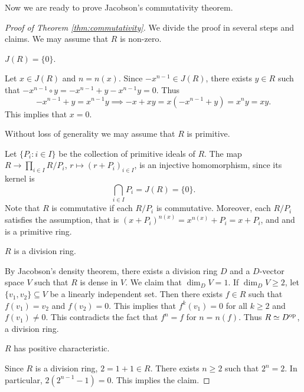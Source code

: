Now we are ready to prove Jacobson's commutativity theorem. 

\begin{proof}[Proof of Theorem \ref{thm:commutativity}]
    We divide the proof in several steps and claims. We may assume that 
    $R$ is non-zero. 
    
    \begin{claim}
        $J(R)=\{0\}$. 
    \end{claim}
    
    Let $x\in J(R)$ and $n=n(x)$. Since $-x^{n-1}\in J(R)$, 
    there exists $y\in R$ such that $-x^{n-1}\circ y=-x^{n-1}+y-x^{n-1}y=0$. Thus
    \[
    -x^{n-1}+y=x^{n-1}y\implies
    -x+xy=x(-x^{n-1}+y)=x^ny=xy.
    \]
    This implies that $x=0$.
    
    \begin{claim}
        Without loss of generality we may assume that $R$ is primitive. 
    \end{claim}
	
	Let $\{P_i:i\in I\}$ be the collection of primitive ideals of $R$. 
	The map 
	$R\to \prod_{i\in I}R/P_i$, $r\mapsto (r+P_i)_{i\in I}$, 
	is an injective homomorphism, since
	its kernel is 
	\[
	\bigcap_{i\in I} P_i=J(R)=\{0\}.
	\]
	Note that
	$R$ is commutative if each $R/P_i$ is commutative.        Moreover, 
	each $R/P_i$ 
	satisfies the assumption, that is 
	$(x+P_i)^{n(x)}=x^{n(x)}+P_i=x+P_i$, and 
	and is a primitive ring. 
	
    \begin{claim}
        $R$ is a division ring. 
    \end{claim}

    By Jacobson's density theorem,
    there exists a division ring $D$ and 
    a $D$-vector space $V$ such that 
    $R$ is dense in $V$. We claim that $\dim_DV=1$. If $\dim_DV\geq 2$, 
    let $\{v_1,v_2\}\subseteq V$ be a linearly independent set. Then
    there exists $f\in R$ such that $f(v_1)=v_2$ and $f(v_2)=0$. This implies
    that $f^{k}(v_1)=0$ for all $k\geq 2$ and $f(v_1)\ne 0$. This contradicts
    the fact that $f^{n}=f$ for $n=n(f)$. Thus $R\simeq D^{\operatorname{op}}$, 
    a division ring. 
    
    \begin{claim}
        $R$ has positive characteristic. 
    \end{claim}

    Since $R$ is a division ring, $2=1+1\in R$. There exists $n\geq2$ 
    such that $2^n=2$. In particular, 
    $2(2^{n-1}-1)=0$. This implies the claim. 
    

\end{proof}
